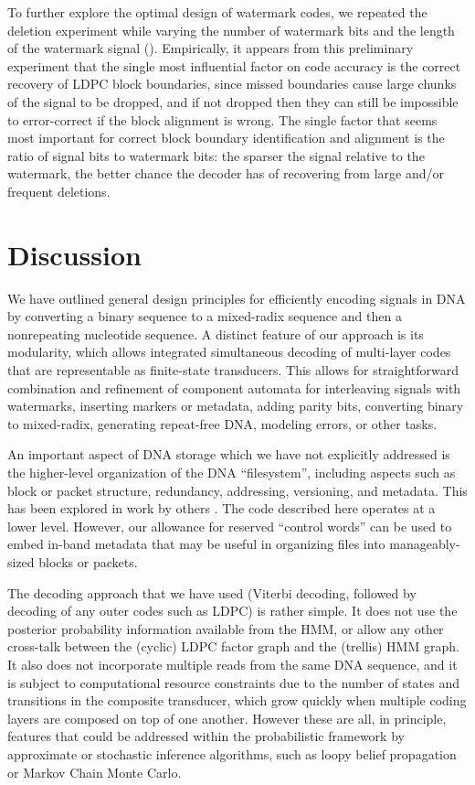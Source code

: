 \documentclass[english]{article}
\begin{document}
To further explore the optimal design of watermark codes, we repeated the deletion experiment
while varying the number of watermark bits and the length of the watermark signal ().
Empirically, it appears from this preliminary experiment that the single most influential factor on code accuracy is the
correct recovery of LDPC block boundaries, since missed boundaries cause large chunks of the signal
to be dropped, and if not dropped then they can still be impossible to error-correct if the block alignment is wrong.
The single factor that seems most important for correct block boundary identification and alignment
is the ratio of signal bits to watermark bits: the sparser the signal relative to the watermark,
the better chance the decoder has of recovering from large and/or frequent deletions.

\section{Discussion}

We have outlined general design principles for efficiently encoding signals in DNA
by converting a binary sequence to a mixed-radix sequence and then a nonrepeating nucleotide sequence.
A distinct feature of our approach is its modularity,
which allows integrated simultaneous decoding of multi-layer codes that are representable as finite-state transducers.
This allows for straightforward combination and refinement of component automata for
interleaving signals with watermarks, inserting markers or metadata, adding parity bits, converting binary to mixed-radix, generating repeat-free DNA,
modeling errors, or other tasks.

An important aspect of DNA storage which we have not explicitly addressed
is the higher-level organization of the DNA ``filesystem'',
including aspects such as block or packet structure, redundancy, addressing,
versioning, and metadata.
This has been explored in work by others \cite{YazdiEtAl2015,BornholtEtAl2016}.
The code described here operates at a lower level.
However, our allowance for reserved ``control words''
can be used to embed in-band metadata that may be useful in organizing files into manageably-sized blocks or packets.

The decoding approach that we have used (Viterbi decoding, followed by decoding of any outer codes such as LDPC) is rather simple.
It does not use the posterior probability information available from the HMM, or allow any other cross-talk between the (cyclic) LDPC factor graph and the (trellis) HMM graph.
It also does not incorporate multiple reads from the same DNA sequence,
and it is subject to computational resource constraints due to the number of states and transitions in the composite transducer,
which grow quickly when multiple coding layers are composed on top of one another.
However these are all, in principle, features that could be addressed within the probabilistic framework by approximate or stochastic inference algorithms,
such as loopy belief propagation or Markov Chain Monte Carlo.
\end{document}
